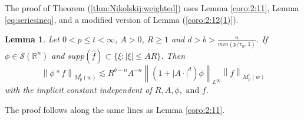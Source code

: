 \documentclass[10pt,a4paper]{article}
\newtheorem{lemma}[theorem]{Lemma}
\theoremstyle{remark}
\newcommand{\rn}{{{\mathbb R}^n}}
\newcommand{\sw}{{\mathcal{S}}(\rn)}
\newcommand{\mow}[3]{M_{#1}^{#2}(#3)}
\newcommand{\norm}[2]{\left\|#1\right\|_{#2}}
\begin{document}
The proof of Theorem (\ref{thm:Nikolskij:weighted}) uses Lemma \ref{coro:2:11}, Lemma \ref{eq:seriesineq}, and a modified version of Lemma (\ref{coro:2:12(1)}).

\begin{lemma}\label{morrey:lemma}
Let $0<p\leq t < \infty$, $A>0$, $R\geq 1$ and $d>b>\frac{n}{min(p/\tau_{w},1)}$. If $\phi \in \sw$ and $supp(\widehat{f}) \subset \{\xi: |\xi| \leq AR \}$. Then 
\begin{equation}
\norm{\phi \ast f}{\mow{p}{t}{w}} \lesssim R^{b-n}A^{-n}\norm{(1+|A\cdot|^d) \phi}{L^\infty} \norm{f}{\mow{p}{t}{w}}
\end{equation}
with the implicit constant independent of $R, A, \phi, \text{ and } f.$
\end{lemma}

The proof follows along the same lines as Lemma \ref{coro:2:11}.
\end{document}

